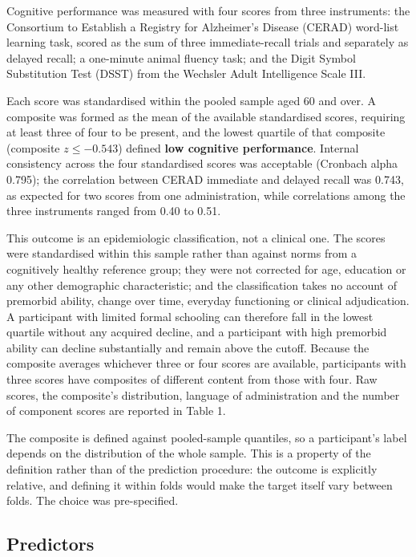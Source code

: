 \documentclass[12pt]{article}
\begin{document}
Cognitive performance was measured with four scores from three instruments: the Consortium to Establish a Registry for Alzheimer's Disease (CERAD) word-list learning task, scored as the sum of three immediate-recall trials and separately as delayed recall; a one-minute animal fluency task; and the Digit Symbol Substitution Test (DSST) from the Wechsler Adult Intelligence Scale III.

Each score was standardised within the pooled sample aged 60 and over. A composite was formed as the mean of the available standardised scores, requiring at least three of four to be present, and the lowest quartile of that composite (composite $z \le -0.543$) defined \textbf{low cognitive performance}. Internal consistency across the four standardised scores was acceptable (Cronbach alpha 0.795); the correlation between CERAD immediate and delayed recall was 0.743, as expected for two scores from one administration, while correlations among the three instruments ranged from 0.40 to 0.51.

This outcome is an epidemiologic classification, not a clinical one. The scores were standardised within this sample rather than against norms from a cognitively healthy reference group; they were not corrected for age, education or any other demographic characteristic; and the classification takes no account of premorbid ability, change over time, everyday functioning or clinical adjudication. A participant with limited formal schooling can therefore fall in the lowest quartile without any acquired decline, and a participant with high premorbid ability can decline substantially and remain above the cutoff. Because the composite averages whichever three or four scores are available, participants with three scores have composites of different content from those with four. Raw scores, the composite's distribution, language of administration and the number of component scores are reported in Table 1.

The composite is defined against pooled-sample quantiles, so a participant's label depends on the distribution of the whole sample. This is a property of the definition rather than of the prediction procedure: the outcome is explicitly relative, and defining it within folds would make the target itself vary between folds. The choice was pre-specified.

\subsection*{Predictors}
\end{document}
